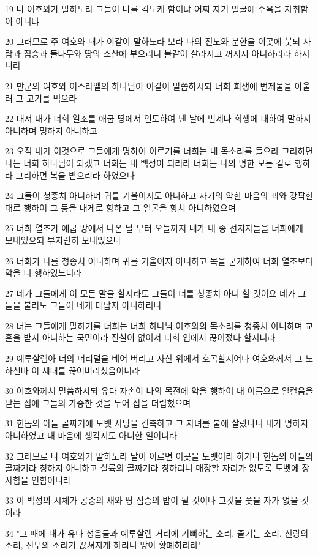 \par 19 나 여호와가 말하노라 그들이 나를 격노케 함이냐 어찌 자기 얼굴에 수욕을 자취함이 아니냐
\par 20 그러므로 주 여호와 내가 이같이 말하노라 보라 나의 진노와 분한을 이곳에 붓되 사람과 짐승과 들나무와 땅의 소산에 부으리니 불같이 살라지고 꺼지지 아니하리라 하시니라
\par 21 만군의 여호와 이스라엘의 하나님이 이같이 말씀하시되 너희 희생에 번제물을 아울러 그 고기를 먹으라
\par 22 대저 내가 너희 열조를 애굽 땅에서 인도하여 낸 날에 번제나 희생에 대하여 말하지 아니하며 명하지 아니하고
\par 23 오직 내가 이것으로 그들에게 명하여 이르기를 너희는 내 목소리를 들으라 그리하면 나는 너희 하나님이 되겠고 너희는 내 백성이 되리라 너희는 나의 명한 모든 길로 행하라 그리하면 복을 받으리라 하였으나
\par 24 그들이 청종치 아니하며 귀를 기울이지도 아니하고 자기의 악한 마음의 꾀와 강퍅한 대로 행하여 그 등을 내게로 향하고 그 얼굴을 향치 아니하였으며
\par 25 너희 열조가 애굽 땅에서 나온 날 부터 오늘까지 내가 내 종 선지자들을 너희에게 보내었으되 부지런히 보내었으나
\par 26 너희가 나를 청종치 아니하며 귀를 기울이지 아니하고 목을 굳게하여 너희 열조보다 악을 더 행하였느니라
\par 27 네가 그들에게 이 모든 말을 할지라도 그들이 너를 청종치 아니 할 것이요 네가 그들을 불러도 그들이 네게 대답지 아니하리니
\par 28 너는 그들에게 말하기를 너희는 너희 하나님 여호와의 목소리를 청종치 아니하며 교훈을 받지 아니하는 국민이라 진실이 없어져 너희 입에서 끊어졌다 할지니라
\par 29 예루살렘아 너의 머리털을 베어 버리고 자산 위에서 호곡할지어다 여호와께서 그 노하신바 이 세대를 끊어버리셨음이니라
\par 30 여호와께서 말씀하시되 유다 자손이 나의 목전에 악을 행하여 내 이름으로 일컬음을 받는 집에 그들의 가증한 것을 두어 집을 더럽혔으며
\par 31 힌놈의 아들 골짜기에 도벳 사당을 건축하고 그 자녀를 불에 살랐나니 내가 명하지 아니하였고 내 마음에 생각지도 아니한 일이니라
\par 32 그러므로 나 여호와가 말하노라 날이 이르면 이곳을 도벳이라 하거나 힌놈의 아들의 골짜기라 칭하지 아니하고 살륙의 골짜기라 칭하리니 매장할 자리가 없도록 도벳에 장사함을 인함이니라
\par 33 이 백성의 시체가 공중의 새와 땅 짐승의 밥이 될 것이나 그것을 쫓을 자가 없을 것이라
\par 34 "그 때에 내가 유다 성읍들과 예루살렘 거리에 기뻐하는 소리, 즐기는 소리, 신랑의 소리, 신부의 소리가 끊쳐지게 하리니 땅이 황폐하리라"

